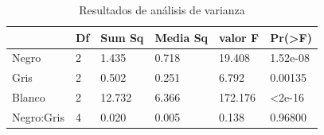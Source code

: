 \documentclass[12pt, letterpaper] {article}
\begin{document}
\begin{table}[H]
\centering\caption{Resultados de análisis de varianza}\label{CRR}
\begin{tabular}{|l|l|l|l|l|l|}
\hline
\rowcolor[HTML]{EFEFEF} 
\multicolumn{1}{|c|}{\cellcolor[HTML]{EFEFEF}{\color[HTML]{333333} \textbf{}}} & \multicolumn{1}{c|}{\cellcolor[HTML]{EFEFEF}\textbf{Df}} & \multicolumn{1}{c|}{\cellcolor[HTML]{EFEFEF}\textbf{Sum Sq}} & \multicolumn{1}{c|}{\cellcolor[HTML]{EFEFEF}\textbf{Media Sq}} & \multicolumn{1}{c|}{\cellcolor[HTML]{EFEFEF}\textbf{valor F}} & \multicolumn{1}{c|}{\cellcolor[HTML]{EFEFEF}\textbf{Pr(\textgreater{}F)}} \\ \hline
\rowcolor[HTML]{ECF4FF} 
{\color[HTML]{333333} Negro}                                                   & {\color[HTML]{333333} 2}                                 & {\color[HTML]{333333} 1.435}                                 & 0.718                                                         & 19.408                                                        & 1.52e-08                                                                  \\ \hline
\rowcolor[HTML]{ECF4FF} 
{\color[HTML]{333333} Gris}                                                    & {\color[HTML]{333333} 2}                                 & {\color[HTML]{333333} 0.502}                                 & 0.251                                                         & 6.792                                                         & 0.00135                                                                   \\ \hline
\rowcolor[HTML]{ECF4FF} 
{\color[HTML]{333333} Blanco}                                                  & {\color[HTML]{333333} 2}                                 & {\color[HTML]{333333} 12.732}                                & 6.366                                                         & 172.176                                                       & \textless{}2e-16                                                          \\ \hline
\rowcolor[HTML]{ECF4FF} 
Negro:Gris                                                                     & 4                                                        & 0.020                                                        & 0.005                                                         & 0.138                                                         & 0.96800                                                                   \\ \hline

\end{tabular}
\end{table}
\end{document}
